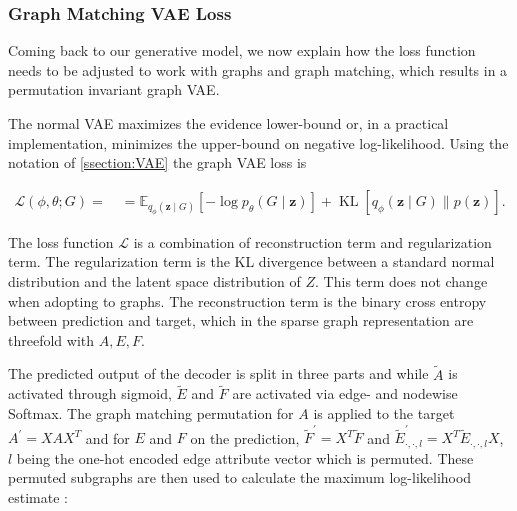 {\subsubsection{Graph Matching VAE Loss}
\label{ssec3:GVAEloss}
Coming back to our generative model, we now explain how the loss function needs to be adjusted to work with graphs and graph matching, which results in a permutation invariant graph VAE.

The normal VAE maximizes the evidence lower-bound or, in a practical implementation, minimizes the upper-bound on negative log-likelihood. Using the notation of \ref{ssection:VAE} the graph VAE loss is

\begin{equation}
    \begin{array}{l}
    \mathcal{L}(\phi, \theta ; G)=\quad=\mathbb{E}_{q_{\phi}(\mathbf{z} \mid G)}\left[-\log p_{\theta}(G \mid \mathbf{z})\right]+\operatorname{KL}\left[q_{\phi}(\mathbf{z} \mid G) \| p(\mathbf{z})\right].
    \end{array}
\end{equation}

The loss function $\mathcal{L}$ is a combination of reconstruction term and regularization term. The regularization term is the KL divergence between a standard normal distribution and the latent space distribution of $Z$. This term does not change when adopting to graphs. The reconstruction term is the binary cross entropy between prediction and target, which in the sparse graph representation are threefold with $A, E, F$. 



The predicted output of the decoder is split in three parts and while $\tilde{A}$ is activated through sigmoid, $\tilde{E}$ and $\tilde{F}$ are activated via edge- and nodewise Softmax. The graph matching permutation for $A$ is applied to the target $A^{\prime}=X A X^{T}$ and for $E$ and $F$ on the prediction, $\widetilde{F}^{\prime}=X^{T} \widetilde{F}$ and $\widetilde{E}_{\cdot, \cdot, l}^{\prime}=X^{T} \widetilde{E}_{\cdot, \cdot, l} X$, $l$ being the one-hot encoded edge attribute vector which is permuted. These permuted subgraphs are then used to calculate the maximum log-likelihood estimate \cite{simonovsky_graphvae_2018}:

}
